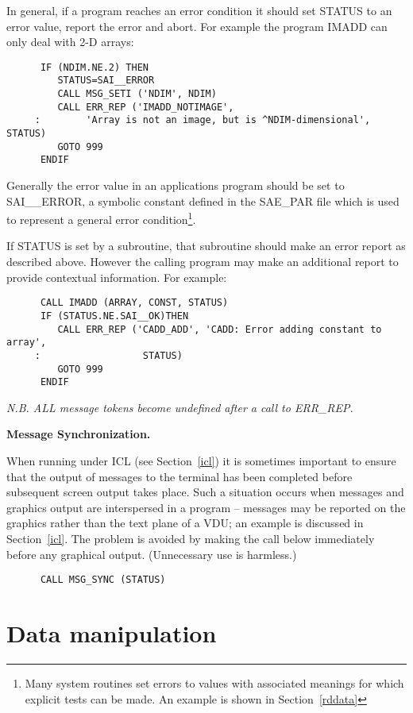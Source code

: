 In general, if a program reaches an error condition it should set STATUS
to  an error value, report the error and abort.
For example the program IMADD can only deal with 2-D arrays:
\begin{verbatim}
      IF (NDIM.NE.2) THEN
         STATUS=SAI__ERROR
         CALL MSG_SETI ('NDIM', NDIM)
         CALL ERR_REP ('IMADD_NOTIMAGE',
     :        'Array is not an image, but is ^NDIM-dimensional', STATUS)
         GOTO 999
      ENDIF
\end{verbatim}
Generally the error value in an applications program should be set 
to SAI\_\_ERROR, a symbolic 
constant defined in the SAE\_PAR file which is used to represent a general
error condition\footnote{Many system routines set errors to 
values with associated meanings for which explicit
tests can be made. An example is shown in Section~\ref{rddata}}.

If STATUS is set by a subroutine, that subroutine should make an error report 
as described above. However the calling program may make an additional 
report to provide contextual information.
For example:
\begin{verbatim}
      CALL IMADD (ARRAY, CONST, STATUS)
      IF (STATUS.NE.SAI__OK)THEN
         CALL ERR_REP ('CADD_ADD', 'CADD: Error adding constant to array',
     :                  STATUS)
         GOTO 999
      ENDIF
\end{verbatim}
{\sl N.B. ALL message tokens become undefined after a call to ERR\_REP.}

{\bigskip\large\bf Message Synchronization.}

When running under ICL (see Section~\ref{icl}) it is sometimes important
to ensure that the output of messages to the terminal has been completed
before subsequent screen output takes place.
Such a situation occurs when messages and graphics output are interspersed 
in a program -- 
messages may be reported on the graphics rather than the text plane of a VDU;
an example is discussed in Section~\ref{icl}.
The problem is avoided by making the call below immediately before any
graphical output. (Unnecessary use is harmless.)
\begin{verbatim}
      CALL MSG_SYNC (STATUS)
\end{verbatim}

\newpage
\section{Data manipulation\label{add7}}

